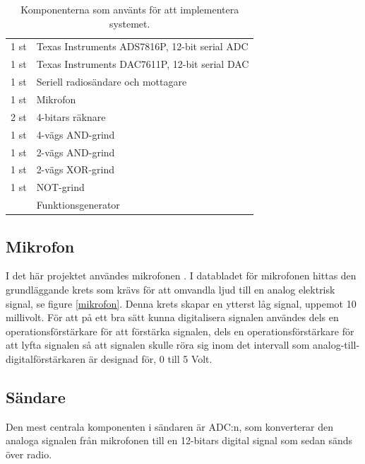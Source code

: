 \documentclass[a4paper,10pt]{article}
\begin{document}
\begin{table}
    \centering
    \begin{tabular}{|l|l|}
    \hline
    1 st & Texas Instruments ADS7816P, 12-bit serial ADC \\
    1 st & Texas Instruments DAC7611P, 12-bit serial DAC \\
    1 st & Seriell radiosändare och mottagare \\
    1 st & Mikrofon \\
    2 st & 4-bitars räknare \\
    1 st & 4-vägs AND-grind\\
    1 st & 2-vägs AND-grind \\
    1 st & 2-vägs XOR-grind \\
    1 st & NOT-grind \\
	 & Funktionsgenerator \\
    \hline
    \end{tabular}
    
    \caption{Komponenterna som använts för att implementera systemet.}
    \label{tab:komponenter}

\end{table}

\subsection{Mikrofon}
I det här projektet användes mikrofonen . I databladet för mikrofonen hittas den grundläggande krets som krävs för att omvandla ljud till en analog elektrisk signal, se figure \ref{mikrofon}. Denna krets skapar en ytterst låg signal, uppemot 10 millivolt. För att på ett bra sätt kunna digitalisera signalen användes dels en operationsförstärkare för att förstärka signalen, dels en operationsförstärkare för att lyfta signalen så att signalen skulle röra sig inom det intervall som analog-till-digitalförstärkaren är designad för, 0 till 5 Volt.



\subsection{Sändare}

Den mest centrala komponenten i sändaren är ADC:n, som konverterar den analoga
signalen från mikrofonen till en 12-bitars digital signal som sedan sänds över
radio.
\end{document}
